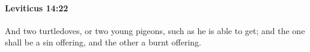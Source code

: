 
		\paragraph{Leviticus 14:22} %
			\label{LEVITICUS-14-22}

			And two turtledoves, or two young pigeons, such as he is able to get; and the one shall be a sin offering, and the other a burnt offering.


